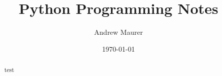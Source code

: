\documentclass[12pt,draft,reqno]{amsart}
\begin{document}
\title{Python Programming Notes}
\author{Andrew Maurer}
\date{\today}

\maketitle


\begin{abstract}
  test
\end{abstract}

\begin{center}
  \parbox{4.7in}{
    \tableofcontents
    }
\end{center}





\appendix
\end{document}
